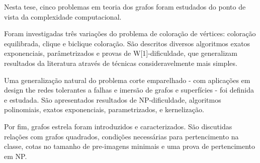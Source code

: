 Nesta tese, cinco problemas em teoria dos grafos foram estudados do ponto de vista da complexidade computacional.

Foram investigadas três variações  do problema de coloração de vértices: coloração equilibrada, clique e biclique coloração. São descritos diversos algoritmos exatos exponenciais, parâmetrizados e provas de W[1]-dificuldade, que generalizam resultados da literatura através de técnicas consideravelmente mais simples.

Uma generalização natural do problema corte emparelhado - com aplicações em design the redes tolerantes a falhas e imersão de grafos e superfícies - foi definida e estudada.
São apresentados resultados de NP-dificuldade, algoritmos polinomiais, exatos exponenciais, parametrizados, e kernelização.

Por fim, grafos estrela foram introduzidos e caracterizados. São discutidas relações com grafos quadrados, condições necessárias para pertencimento na classe, cotas no tamanho de pre-imagens minimais e uma prova de pertencimento em NP.